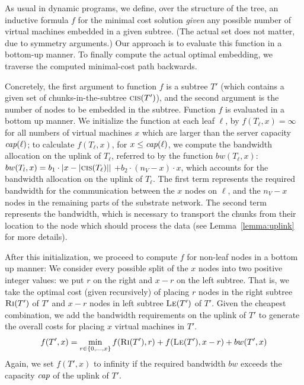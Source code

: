 \documentclass[9pt]{sigcomm-alternate}
\newcommand{\carlo}[1]{\textcolor{red}{carlo: #1}}
\newcommand{\ChunkCount}{\ensuremath{\textsc{cis}}}
\newcommand{\capacity}{\emph{cap}}
\newcommand{\Tree}{\ensuremath{T}}
\newcommand{\CostTrans}{\ensuremath{b_1}}
\newcommand{\CostCom}{\ensuremath{b_2}}
\newcommand{\Vms}{\ensuremath{n_V}}
\begin{document}
As usual in dynamic programs, we define, over the structure of the tree, an inductive formula $f$ for
the minimal cost solution \emph{given} any possible number of virtual
machines embedded in a given subtree. (The actual set does not matter,
due to symmetry arguments.)
Our approach is to evaluate this function in a bottom-up
manner.
To finally compute the actual optimal embedding,
we traverse the computed minimal-cost path backwards.

Concretely, the first argument to function $f$
is a subtree $\Tree'$ (which contains a given set of chunks-in-the-subtree $\ChunkCount(\Tree')$),
and the
second argument is the number of nodes to be embedded in the subtree.
Function $f$ is evaluated in a bottom up manner. We initialize the
function at each leaf $\ell$, by $f(T_{\ell},x) =
\infty$ for all numbers of virtual machines $x$ which are larger than
the server capacity $\capacity(\ell)$;
to calculate $f(T_{\ell}, x)$, for $x \leq \capacity(\ell)$, we compute the
bandwidth allocation on the uplink of $T_{\ell}$, referred to by the function
$bw(T_{\ell},x)$: $bw(T_l,x)=  \CostTrans \cdot |x - |\ChunkCount(T_{\ell})||$ $
+ \CostCom \cdot (\Vms - x) \cdot x$,
which accounts for the bandwidth allocation on the uplink of $T_{\ell}$. The first
term represents the required bandwidth for the communication between the $x$
nodes on $\ell$, and the $\Vms - x$ nodes in the remaining parts of the substrate
network.
The second term represents
the bandwidth, which is necessary to transport the chunks from their location to
the node which should process the data (see Lemma~\ref{lemma:uplink} for more
details).

After this initialization, we proceed to compute $f$ for non-leaf
nodes in a bottom up manner: We consider every possible split of the $x$ nodes
into two positive integer
values: we put $r$ on the right and $x - r$ on the left subtree.
That is, we take the optimal cost
(given recursively) of placing $r$ nodes in
the right subtree $\textsc{Ri}(T')$ of $T'$ and $x-r$ nodes in left subtree $\textsc{Le}(T')$ of
$T'$. Given the cheapest combination, we add the bandwidth requirements
on the uplink of $T'$ to generate the overall costs for placing $x$ virtual
machines in $T'$.
$$f(T',x) =   \min_{r \in \{0, \ldots, x\}}  f(\textsc{Ri}(T'), r) +
f(\textsc{Le}(T'), x - r) + bw(T',x)$$
Again, we set $f(T',x)$ to infinity if the required bandwidth
$bw$ exceeds the capacity $\capacity$ of the uplink of $T'$.
\end{document}
